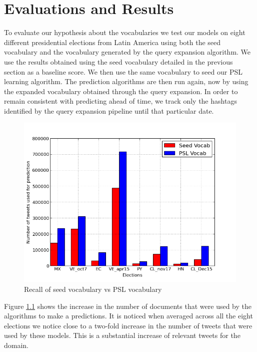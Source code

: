\chapter{Evaluations and Results}
To evaluate our hypothesis about the vocabularies we test our models on eight different presidential elections from Latin America using both the seed vocabulary and the vocabulary generated by the query expansion algorithm.
We use the results obtained using the seed vocabulary detailed in the previous section as a baseline score.
We then use the same vocabulary to seed our PSL learning algorithm. 
The prediction algorithms are then run again, now by using the expanded vocabulary obtained through the query expansion.
In order to remain consistent with predicting ahead of time, we track only the hashtags identified by the query expansion pipeline  until that particular date.

\begin{figure}
	\centering
	\includegraphics[scale=0.65]{support_files/Recall.png}
	\caption{Recall of seed vocabulary vs PSL vocabulary}
	\label{fig:recall}
\end{figure}

Figure \ref{fig:recall} shows the increase in the number of documents that were used by the algorithms to make a predictions.
It is noticed when averaged across all the eight elections we notice close to a two-fold increase in the number of 
tweets that were used by these models.
This is a substantial increase of relevant tweets for the domain.

